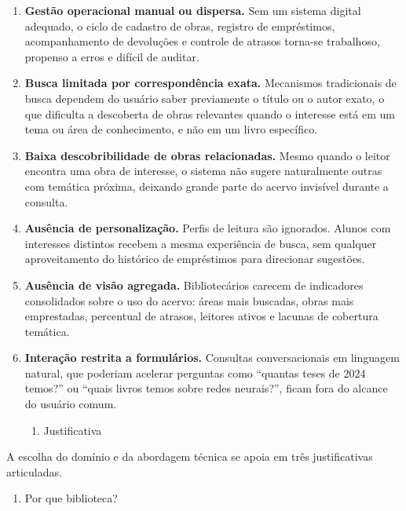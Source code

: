 \documentclass[
]{article}
\begin{document}
\begin{enumerate}
\def\labelenumi{\alph{enumi}.}
\item
  \textbf{Gestão operacional manual ou dispersa.} Sem um sistema digital
  adequado, o ciclo de cadastro de obras, registro de empréstimos,
  acompanhamento de devoluções e controle de atrasos torna-se
  trabalhoso, propenso a erros e difícil de auditar.
\item
  \textbf{Busca limitada por correspondência exata.} Mecanismos
  tradicionais de busca dependem do usuário saber previamente o título
  ou o autor exato, o que dificulta a descoberta de obras relevantes
  quando o interesse está em um tema ou área de conhecimento, e não em
  um livro específico.
\item
  \textbf{Baixa descobribilidade de obras relacionadas.} Mesmo quando o
  leitor encontra uma obra de interesse, o sistema não sugere
  naturalmente outras com temática próxima, deixando grande parte do
  acervo invisível durante a consulta.
\item
  \textbf{Ausência de personalização.} Perfis de leitura são ignorados.
  Alunos com interesses distintos recebem a mesma experiência de busca,
  sem qualquer aproveitamento do histórico de empréstimos para
  direcionar sugestões.
\item
  \textbf{Ausência de visão agregada.} Bibliotecários carecem de
  indicadores consolidados sobre o uso do acervo: áreas mais buscadas,
  obras mais emprestadas, percentual de atrasos, leitores ativos e
  lacunas de cobertura temática.
\item
  \textbf{Interação restrita a formulários.} Consultas conversacionais
  em linguagem natural, que poderiam acelerar perguntas como ``quantas
  teses de 2024 temos?'' ou ``quais livros temos sobre redes neurais?'',
  ficam fora do alcance do usuário comum.

  \begin{enumerate}
  \def\labelenumii{\arabic{enumii}.}
  \item
    \protect{}\label{_Toc230227804}{}Justificativa
  \end{enumerate}
\end{enumerate}

A escolha do domínio e da abordagem técnica se apoia em três
justificativas articuladas.

\begin{enumerate}
\def\labelenumi{\alph{enumi}.}
\item
  Por que biblioteca?
\end{enumerate}
\end{document}
